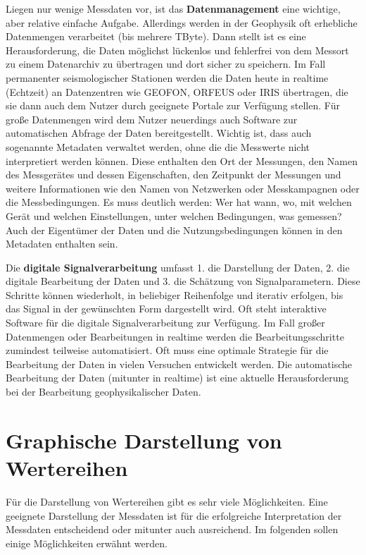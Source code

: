 Liegen nur wenige Messdaten vor, ist das {\bf Datenmanagement} eine wichtige, aber relative einfache Aufgabe. Allerdings werden in der Geophysik oft erhebliche Datenmengen verarbeitet (bis mehrere TByte). Dann stellt ist es eine Herausforderung, die Daten möglichst lückenlos und fehlerfrei von dem Messort zu einem Datenarchiv zu übertragen und dort sicher zu speichern. Im Fall permanenter seismologischer Stationen werden die Daten heute in realtime (Echtzeit) an Datenzentren wie GEOFON, ORFEUS oder IRIS übertragen, die sie dann auch dem Nutzer durch geeignete Portale zur Verfügung stellen. Für große Datenmengen wird dem Nutzer neuerdings auch Software zur automatischen Abfrage der Daten bereitgestellt. Wichtig ist, dass auch sogenannte Metadaten verwaltet werden, ohne die die Messwerte nicht interpretiert werden können. Diese enthalten den Ort der Messungen, den Namen des Messgerätes und dessen Eigenschaften, den Zeitpunkt der Messungen und weitere Informationen wie den Namen von Netzwerken oder Messkampagnen oder die Messbedingungen. Es muss deutlich werden: Wer hat wann, wo, mit welchen Gerät und welchen Einstellungen, unter welchen Bedingungen, was gemessen? Auch der Eigentümer der Daten und die Nutzungsbedingungen können in den Metadaten enthalten sein.

Die {\bf digitale Signalverarbeitung} umfasst 1. die Darstellung der Daten, 2. die digitale Bearbeitung der Daten und 3. die Schätzung von Signalparametern. Diese Schritte können wiederholt, in beliebiger Reihenfolge und iterativ erfolgen, bis das Signal in der gewünschten Form dargestellt wird. Oft steht interaktive Software für die digitale Signalverarbeitung zur Verfügung. Im Fall großer Datenmengen oder Bearbeitungen in realtime werden die Bearbeitungsschritte zumindest teilweise automatisiert. Oft muss eine optimale Strategie für die Bearbeitung der Daten in vielen Versuchen entwickelt werden. Die automatische Bearbeitung der Daten (mitunter in realtime) ist eine aktuelle Herausforderung bei der Bearbeitung geophysikalischer Daten.

\newpage


\section{Graphische Darstellung von Wertereihen}
Für die Darstellung von Wertereihen gibt es sehr viele Möglichkeiten. Eine geeignete Darstellung der Messdaten ist für die erfolgreiche Interpretation der Messdaten entscheidend oder mitunter auch ausreichend. Im folgenden sollen einige Möglichkeiten erwähnt werden.\\[.5cm]

